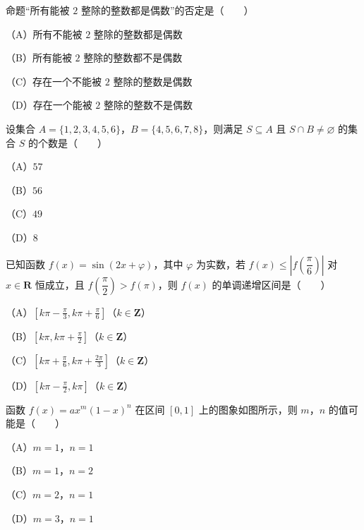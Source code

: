 \begin{question}
命题“所有能被 $2$ 整除的整数都是偶数”的否定是\mbox{（　　）}

（A）所有不能被 $2$ 整除的整数都是偶数

（B）所有能被 $2$ 整除的整数都不是偶数

（C）存在一个不能被 $2$ 整除的整数是偶数

（D）存在一个能被 $2$ 整除的整数不是偶数

\end{question}
\begin{question}
设集合 $A=\{1,2,3,4,5,6\}$，$B=\{4,5,6,7,8\}$，则满足 $S\subseteq A$ 且 $S\cap B\neq\varnothing$ 的集合 $S$ 的个数是\mbox{（　　）}

（A）$57$

（B）$56$

（C）$49$

（D）$8$

\end{question}
\begin{question}
已知函数 $f(x)=\sin(2x+\varphi)$，其中 $\varphi$ 为实数，若 $f(x)\leqslant\left|f\left(\dfrac{\pi}{6}\right)\right|$ 对 $x\in\mathbf R$ 恒成立，且 $f\left(\dfrac{\pi}{2}\right)>f(\pi)$，则 $f(x)$ 的单调递增区间是\mbox{（　　）}

（A）$\left[k\pi-\frac{\pi}{3},k\pi+\frac{\pi}{6}\right]$（$k\in\mathbf Z$）

（B）$\left[k\pi,k\pi+\frac{\pi}{2}\right]$（$k\in\mathbf Z$）

（C）$\left[k\pi+\frac{\pi}{6},k\pi+\frac{2\pi}{3}\right]$（$k\in\mathbf Z$）

（D）$\left[k\pi-\frac{\pi}{2},k\pi\right]$（$k\in\mathbf Z$）

\Needspace{0.4\textheight}
\end{question}
\begin{question}
函数 $f(x)=ax^m(1-x)^n$ 在区间 $[0,1]$ 上的图象如图所示，则 $m$，$n$ 的值可能是\mbox{（　　）}

（A）$m=1$，$n=1$

（B）$m=1$，$n=2$

（C）$m=2$，$n=1$

（D）$m=3$，$n=1$
\nopagebreak[4]
\begin{center}\end{center}
\nopagebreak[4]
\end{question}

